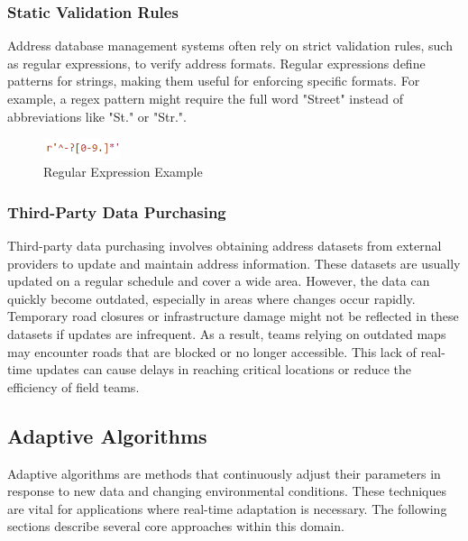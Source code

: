         \subsubsection{Static Validation Rules}
        Address database management systems often rely on strict validation rules, such as regular expressions, to verify address formats. Regular expressions define patterns for strings, making them useful for enforcing specific formats. For example, a regex pattern might require the full word "Street" instead of abbreviations like "St." or "Str.". \autocite{AutorenderWikimedia-Projekte2002Jul}\\


        \begin{figure}[H]
            \centering
            \includegraphics[width=0.2\textwidth]{images/AdminPanel/regexInputFormatter.png}
            \caption{Regular Expression Example}
            \label{fig:regex}
        \end{figure}



        \subsubsection{Third-Party Data Purchasing}
        Third-party data purchasing involves obtaining address datasets from external providers to update and maintain address information. These datasets are usually updated on a regular schedule and cover a wide area. However, the data can quickly become outdated, especially in areas where changes occur rapidly.\\

        Temporary road closures or infrastructure damage might not be reflected in these datasets if updates are infrequent. As a result, teams relying on outdated maps may encounter roads that are blocked or no longer accessible. This lack of real-time updates can cause delays in reaching critical locations or reduce the efficiency of field teams.


    \subsection{Adaptive Algorithms}
    Adaptive algorithms are methods that continuously adjust their parameters in response to new data and changing environmental conditions. These techniques are vital for applications where real-time adaptation is necessary. The following sections describe several core approaches within this domain. \autocite{AdaptiveWikimediaprojects2024Aug}\newpage


